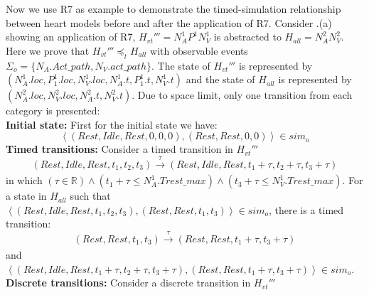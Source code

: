 Now we use R7 as example to demonstrate the timed-simulation relationship between heart models before and after the application of R7.
Consider .(a) showing an application of R7, $H_{vt}'''=N^1_AP^1N^1_V$ is abstracted to $H_{all}=N^2_AN^2_V$. Here we prove that $H_{vt}'''\preceq_t H_{all}$ with observable events $\Sigma_o=\{N_A.Act\_path,N_V.act\_path\}$. The state of $H_{vt}'''$ is represented by $(N^1_A.loc,P^1_1.loc,N^1_V.loc,N^1_A.t,P^1_1.t,N^1_V.t)$ and the state of $H_{all}$ is represented by $(N^2_A.loc,N^2_V.loc,N^2_A.t,N^2_V.t)$. Due to space limit, only one transition from each category is presented:\\
\textbf{Initial state: }First for the initial state we have:
$$\left\langle (Rest,Idle,Rest,0,0,0),(Rest,Rest,0,0)\right\rangle\in sim_o$$ 
\textbf{Timed transitions: }Consider a timed transition in $H_{vt}'''$
$$(Rest,Idle,Rest,t_1,t_2,t_3)\xrightarrow[]{\tau}(Rest,Idle,Rest,t_1+\tau,t_2+\tau,t_3+\tau)$$
in which $(\tau\in\mathbb{R})\wedge (t_1+\tau\leq N^1_A.Trest\_max)\wedge( t_3+\tau\leq N^1_V.Trest\_max)$. For a state in $H_{all}$ such that $\left\langle (Rest,Idle,Rest,t_1,t_2,t_3),(Rest,Rest,t_1,t_3)\right\rangle\in sim_o$,  there is a timed transition:
$$(Rest,Rest,t_1,t_3)\xrightarrow[]{\tau}(Rest,Rest,t_1+\tau,t_3+\tau)$$
and $\left\langle (Rest,Idle,Rest,t_1+\tau,t_2+\tau,t_3+\tau),(Rest,Rest,t_1+\tau,t_3+\tau)\right\rangle\in sim_o$.\\
%
\textbf{Discrete transitions: }Consider a discrete transition in $H_{vt}'''$
